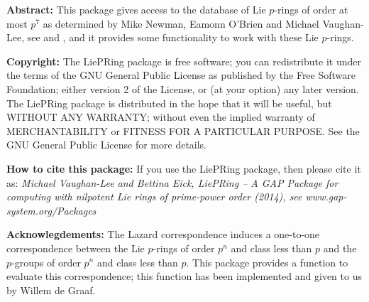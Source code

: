 

{\bf Abstract:}
This package gives access to the database of Lie $p$-rings of order at most 
$p^7$ as determined by Mike Newman, Eamonn O'Brien and Michael Vaughan-Lee, 
see \cite{NOV04} and \cite{OVL05}, and it provides some functionality to 
work with these Lie $p$-rings.
\bigskip

{\bf Copyright:}
The LiePRing package is free software; you can redistribute it under the 
terms of the GNU General Public License as published by the Free Software 
Foundation; either version 2 of the License, or (at your option) any 
later version. The LiePRing package is distributed in the hope that it will 
be useful, but WITHOUT ANY WARRANTY; without even the implied warranty of
MERCHANTABILITY or FITNESS FOR A PARTICULAR PURPOSE. See the GNU General 
Public License for more details.
\bigskip

{\bf How to cite this package:}
If you use the LiePRing package, then please cite it as:
{\it Michael Vaughan-Lee and Bettina Eick, LiePRing -- A GAP Package for
computing with nilpotent Lie rings of prime-power order (2014), see
www.gap-system.org/Packages}
\bigskip

{\bf Acknowlegdements:}
The Lazard correspondence induces a one-to-one correspondence between the
Lie $p$-rings of order $p^n$ and class less than $p$ and the $p$-groups of 
order $p^n$ and class less than $p$. This package provides a function to 
evaluate this correspondence; this function has been implemented and given
to us by Willem de Graaf. 

